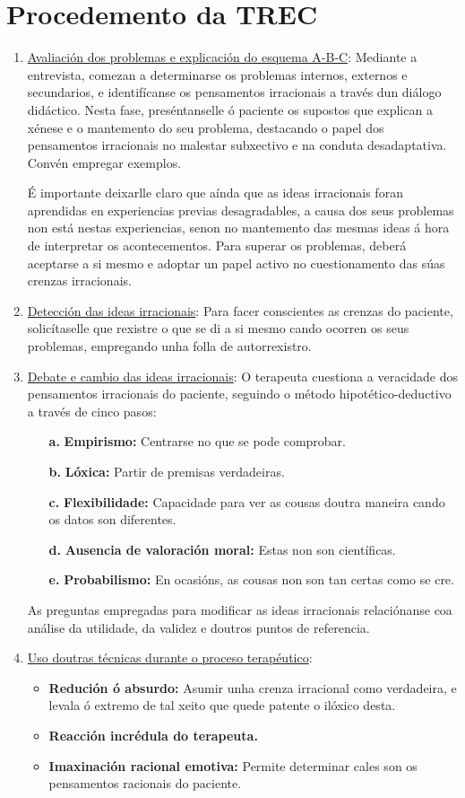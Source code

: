 \documentclass[a4paper,11pt]{article}
\begin{document}
\section{Procedemento da TREC}
\begin{enumerate}
	\item \underline{Avaliación dos problemas e explicación do esquema A-B-C}: Mediante a entrevista, 
	comezan a determinarse os problemas internos, externos e secundarios, e identifícanse os 
	pensamentos irracionais a través dun diálogo didáctico. Nesta fase, preséntanselle ó paciente os 
	supostos que explican a xénese e o mantemento do seu problema, destacando o papel dos pensamentos 
	irracionais no malestar subxectivo e na conduta desadaptativa. Convén empregar exemplos.
	
	É importante deixarlle claro que aínda que as ideas irracionais foran aprendidas en experiencias 
	previas desagradables, a causa dos seus problemas non está nestas experiencias, senon no 
	mantemento das mesmas ideas á hora de interpretar os acontecementos. Para superar os problemas, 
	deberá aceptarse a si mesmo e adoptar un papel activo no cuestionamento das súas crenzas 
	irracionais.
	\item \underline{Detección das ideas irracionais}: Para facer conscientes as crenzas do paciente, 
	solicítaselle que rexistre o que se di a si mesmo cando ocorren os seus problemas, empregando 
	unha folla de autorrexistro.
	\item \underline{Debate e cambio das ideas irracionais}: O terapeuta cuestiona a veracidade dos 
	pensamentos irracionais do paciente, seguindo o método hipotético-deductivo a través de cinco 
	pasos:
	\begin{enumerate}
		\item[\textbf{a.}] \textbf{Empirismo:} Centrarse no que se pode comprobar.
		\item[\textbf{b.}] \textbf{Lóxica:} Partir de premisas verdadeiras.
		\item[\textbf{c.}] \textbf{Flexibilidade:} Capacidade para ver as cousas doutra maneira cando 
		os datos son diferentes.
		\item[\textbf{d.}] \textbf{Ausencia de valoración moral:} Estas non son científicas.
		\item[\textbf{e.}] \textbf{Probabilismo:} En ocasións, as cousas non son tan certas como se 
		cre.
	\end{enumerate}
	
	As preguntas empregadas para modificar as ideas irracionais relaciónanse coa análise da 
	utilidade, da validez e doutros puntos de referencia.
	\item \underline{Uso doutras técnicas durante o proceso terapéutico}: 
	\begin{itemize}
		\item \textbf{Redución ó absurdo:} Asumir unha crenza irracional como verdadeira, e levala ó 
		extremo de tal xeito que quede patente o ilóxico desta.
		\item \textbf{Reacción incrédula do terapeuta.}
		\item \textbf{Imaxinación racional emotiva:} Permite determinar cales son os pensamentos 
		racionais do paciente.
	\end{itemize}
	

\end{enumerate}
\end{document}
